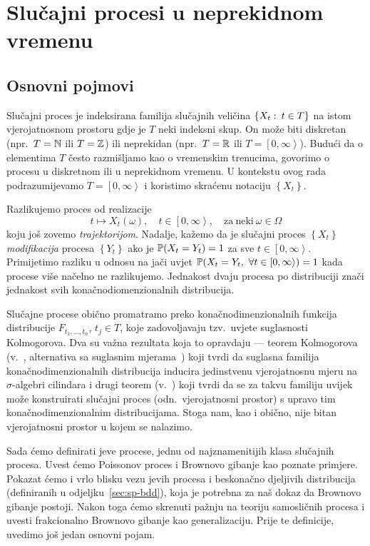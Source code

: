 \documentclass[main.tex]{subfiles}
\begin{document}
\nocite{*}

\chapter{Slučajni procesi u neprekidnom vremenu} \label{ch:sp}
\section{Osnovni pojmovi} \label{sec:sp-osnovni}
Slučajni proces je indeksirana familija slučajnih veličina \( \left\{ X_t \st t \in T \right\} \) na istom vjerojatnosnom prostoru
gdje je \( T \) neki indeksni skup. On može biti diskretan (npr.\ \( T = \N \) ili \( T = \Z \))
ili neprekidan (npr.\ \( T = \R \) ili \( T = \left[ 0, \infty \right\rangle  \)). Budući da o
elementima \( T \) često razmišljamo kao o vremenskim trenucima, govorimo o procesu u diskretnom
ili u neprekidnom vremenu.
U kontekstu ovog rada podrazumijevamo \( T = \left[ 0,\infty \right\rangle \) i koristimo skraćenu notaciju
\( \left\{ X_t \right\} \).

Razlikujemo proces od realizacije
\[ t \mapsto X_t(\omega), \quad t \in \left[ 0,\infty \right\rangle, \quad \mathrm{za \ neki} \ \omega \in \Omega \]
koju još zovemo \emph{trajektorijom}. Nadalje, kažemo da je slučajni proces \( \left\{ X_t \right\} \) \emph{modifikacija} procesa
\( \left\{ Y_t \right\} \) ako je \( \P(X_t = Y_t) = 1 \) za sve \( t \in \left[ 0,\infty \right\rangle \). Primijetimo razliku u odnosu
na jači uvjet \( \P(X_t = Y_t,\ \forall t \in \left[ 0,\infty \right\rangle) = 1 \) kada procese više načelno ne razlikujemo.
Jednakost dvaju procesa po distribuciji znači jednakost svih konačnodiomenzionalnih distribucija.

Slučajne procese obično promatramo preko konačnodimenzionalnih funkcija distribucije
\( F_{t_1, \ldots, t_n} \), \( t_j \in T \), koje zadovoljavaju tzv.\ uvjete suglasnosti Kolmogorova.
Dva su važna rezultata koja to opravdaju --- teorem Kolmogorova (v.~\cite[tm.~9.6]{sarapa}, alternativa sa suglasnim mjerama~\cite[tm.~1.8]{sato}) koji tvrdi
da suglasna familija konačnodimenzionalnih distribucija inducira je\-din\-stve\-nu vjerojatnosnu mjeru na \( \sigma \)-algebri cilindara
i drugi teorem (v.~\cite[tm.~9.7]{sarapa}) koji tvrdi da se za takvu familiju uvijek može konstruirati
slučajni proces (odn.\ vjerojatnosni prostor) s upravo tim konačnodimenzionalnim distribucijama. Stoga nam, kao i obično,
nije bitan vjerojatnosni prostor u kojem se nalazimo.

Sada ćemo definirati \levy jeve procese, jednu od najznamenitijih klasa slučajnih procesa. Uvest ćemo Poissonov proces
i Brownovo gibanje kao poznate primjere. Pokazat ćemo i vrlo blisku vezu \levy jevih procesa i beskonačno djeljivih distribucija (definiranih u odjeljku~\ref{sec:sp-bdd}), koja
je potrebna za naš dokaz da Brownovo gibanje postoji. Nakon toga ćemo skrenuti pažnju na teoriju samosličnih procesa i uvesti
frakcionalno Brownovo gibanje kao generalizaciju. Prije te definicije, uvedimo još jedan osnovni pojam.
\end{document}
